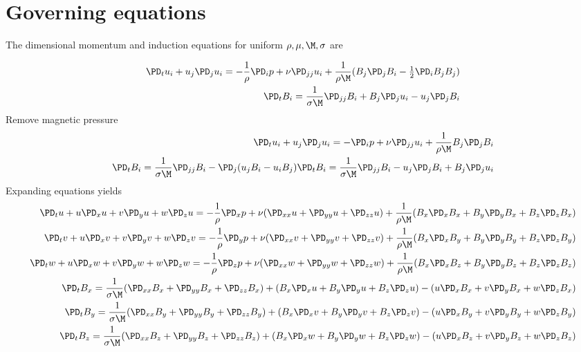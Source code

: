 \documentclass[11pt]{article}
\begin{document}
\doublespacing
\MOONSTITLE
\maketitle

\section{Governing equations}
The dimensional momentum and induction equations for uniform $\rho,\mu,\M,\sigma$ are

\begin{equation}\begin{aligned}
\PD_t u_i+u_j\PD_j u_i = - \frac{1}{\rho} \PD_i p+ \nu \PD_{jj} u_i + \frac{1}{\rho \M} (B_j \PD_j B_i - \tfrac{1}{2} \PD_i B_j B_j) \\
\PD_t B_i = \frac{1}{\sigma \M} \PD_{jj} B_i + B_j \PD_j u_i - u_j \PD_j B_i
\end{aligned} \end{equation}
Remove magnetic pressure
\begin{equation}\begin{aligned}
\PD_t u_i+u_j\PD_j u_i = -\PD_i p+ \nu \PD_{jj} u_i + \frac{1}{\rho \M} B_j \PD_j B_i \\
\PD_t B_i = \frac{1}{\sigma \M} \PD_{jj} B_i - \PD_j (u_j B_i - u_i B_j)
\PD_t B_i = \frac{1}{\sigma \M} \PD_{jj} B_i - u_j \PD_j B_i + B_j \PD_j u_i
\end{aligned} \end{equation}
Expanding equations yields
\begin{equation}\begin{aligned}
\PD_t u+ u\PD_x u + v\PD_y u + w\PD_z u = -\frac{1}{\rho}\PD_x p+ \nu (\PD_{xx} u+\PD_{yy} u+\PD_{zz} u) + \frac{1}{\rho \M} (B_x \PD_x B_x + B_y \PD_y B_x + B_z \PD_z B_x) \\
\PD_t v+ u\PD_x v + v\PD_y v + w\PD_z v = -\frac{1}{\rho}\PD_y p+ \nu (\PD_{xx} v+\PD_{yy} v+\PD_{zz} v) + \frac{1}{\rho \M} (B_x \PD_x B_y + B_y \PD_y B_y + B_z \PD_z B_y) \\
\PD_t w+ u\PD_x w + v\PD_y w + w\PD_z w = -\frac{1}{\rho}\PD_z p+ \nu (\PD_{xx} w+\PD_{yy} w+\PD_{zz} w) + \frac{1}{\rho \M} (B_x \PD_x B_z + B_y \PD_y B_z + B_z \PD_z B_z) \\
\PD_t B_x = \frac{1}{\sigma \M} (\PD_{xx} B_x + \PD_{yy} B_x+\PD_{zz} B_x) + (B_x \PD_x u + B_y \PD_y u + B_z \PD_z u)  - (u \PD_x B_x + v \PD_y B_x + w \PD_z B_x) \\
\PD_t B_y = \frac{1}{\sigma \M} (\PD_{xx} B_y + \PD_{yy} B_y+\PD_{zz} B_y) + (B_x \PD_x v + B_y \PD_y v + B_z \PD_z v)  - (u \PD_x B_y + v \PD_y B_y + w \PD_z B_y) \\
\PD_t B_z = \frac{1}{\sigma \M} (\PD_{xx} B_z + \PD_{yy} B_z+\PD_{zz} B_z) + (B_x \PD_x w + B_y \PD_y w + B_z \PD_z w)  - (u \PD_x B_z + v \PD_y B_z + w \PD_z B_z) \\
\end{aligned} \end{equation}
\end{document}
